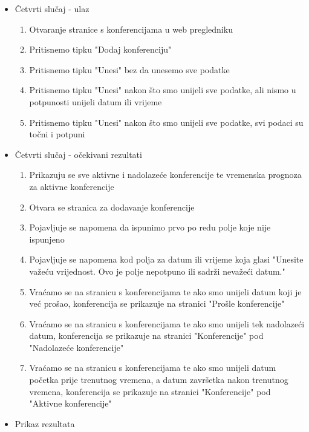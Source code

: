 			 \begin{itemize}
			 	\item Četvrti slučaj - ulaz
			 	\begin{enumerate}
			 		\item Otvaranje stranice s konferencijama u web pregledniku
			 		\item Pritisnemo tipku "Dodaj konferenciju"
			 		\item Pritisnemo tipku "Unesi" bez da unesemo sve podatke
			 		\item Pritisnemo tipku "Unesi" nakon što smo unijeli sve podatke, ali nismo u potpunosti unijeli datum ili vrijeme
			 		\item Pritisnemo tipku "Unesi" nakon što smo unijeli sve podatke, svi podaci su točni i potpuni
			 	\end{enumerate}
			 	\item Četvrti slučaj - očekivani rezultati
			 	\begin{enumerate}
			 		\item Prikazuju se sve aktivne i nadolazeće konferencije te vremenska prognoza za aktivne konferencije
			 		\item Otvara se stranica za dodavanje konferencije
			 		\item Pojavljuje se napomena da ispunimo prvo po redu polje koje nije ispunjeno
			 		\item Pojavljuje se napomena kod polja za datum ili vrijeme koja glasi "Unesite važeću vrijednost. Ovo je polje nepotpuno ili sadrži nevažeći datum."
			 		\item Vraćamo se na stranicu s konferencijama te ako smo unijeli datum koji je već prošao, konferencija se prikazuje na stranici "Prošle konferencije"
			 		\item Vraćamo se na stranicu s konferencijama te ako smo unijeli tek nadolazeći datum, konferencija se prikazuje na stranici "Konferencije" pod "Nadolazeće konferencije"
			 		\item Vraćamo se na stranicu s konferencijama te ako smo unijeli datum početka prije trenutnog vremena, a datum završetka nakon trenutnog vremena, konferencija se prikazuje na stranici "Konferencije" pod "Aktivne konferencije"
			 	\end{enumerate}
			 	\item Prikaz rezultata
			 	\begin{figure}[htb]
			 		\centering

\end{figure}
\end{itemize}
